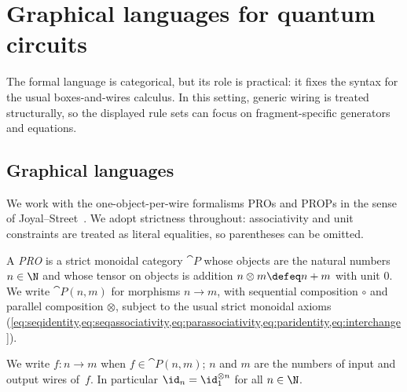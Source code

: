 \section{Graphical languages for quantum circuits}\label{sec:circuits}

The formal language is categorical, but its role is practical: it fixes the syntax for the usual
boxes-and-wires calculus.  In this setting, generic wiring is treated structurally, so the
displayed rule sets can focus on fragment-specific generators and equations.

\subsection{Graphical languages}

We work with the one-object-per-wire formalisms PROs and PROPs in the sense of
Joyal--Street~\cite{joyal_geometry_1991, selinger_survey_2010}.
We adopt strictness throughout: associativity
and unit constraints are treated as literal equalities, so parentheses can be omitted.

\begin{definition}
A \emph{PRO} is a strict monoidal category \(\cat{P}\) whose objects are the
natural numbers \(n\in\N\) and whose tensor on objects is addition
\(n\otimes m \defeq n+m\) with unit \(0\).  We write \(\cat{P}(n,m)\) for morphisms
\(n\to m\), with sequential composition \(\circ\) and parallel composition \(\otimes\),
subject to the usual strict monoidal axioms
(\cref{eq:seqidentity,eq:seqassociativity,eq:parassociativity,eq:paridentity,eq:interchange}).
\end{definition}

We write \(f:n\to m\) when \(f\in\cat{P}(n,m)\); \(n\) and \(m\) are the numbers of input
and output wires of~\(f\).  In particular \(\id_n=\id_1^{\otimes n}\) for all \(n\in\N\).

